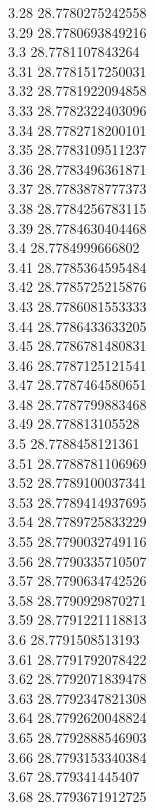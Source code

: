 {3.28	28.7780275242558\\
3.29	28.7780693849216\\
3.3	28.7781107843264\\
3.31	28.7781517250031\\
3.32	28.7781922094858\\
3.33	28.7782322403096\\
3.34	28.7782718200101\\
3.35	28.7783109511237\\
3.36	28.7783496361871\\
3.37	28.7783878777373\\
3.38	28.7784256783115\\
3.39	28.7784630404468\\
3.4	28.7784999666802\\
3.41	28.7785364595484\\
3.42	28.7785725215876\\
3.43	28.7786081553333\\
3.44	28.7786433633205\\
3.45	28.7786781480831\\
3.46	28.7787125121541\\
3.47	28.7787464580651\\
3.48	28.7787799883468\\
3.49	28.778813105528\\
3.5	28.7788458121361\\
3.51	28.7788781106969\\
3.52	28.7789100037341\\
3.53	28.7789414937695\\
3.54	28.7789725833229\\
3.55	28.7790032749116\\
3.56	28.7790335710507\\
3.57	28.7790634742526\\
3.58	28.7790929870271\\
3.59	28.7791221118813\\
3.6	28.7791508513193\\
3.61	28.7791792078422\\
3.62	28.7792071839478\\
3.63	28.7792347821308\\
3.64	28.7792620048824\\
3.65	28.7792888546903\\
3.66	28.7793153340384\\
3.67	28.779341445407\\
3.68	28.7793671912725\\
}
